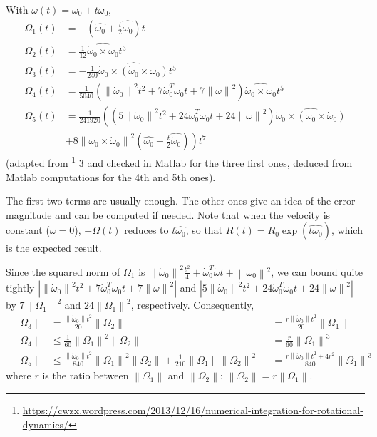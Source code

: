 \documentclass[]{article}
\newcommand{\norm}[1]{\left\| #1 \right\|}
\newcommand{\w}{\omega}
\newcommand{\dw}{\dot{\omega}}
\begin{document}
With $\w(t) = \w_0 + t \dot{\w}_0$,
\begin{align}
	\Omega_1(t) & = -(\widehat{\w_0} + \frac{t}{2}\widehat{\dw_0})t \\
	\Omega_2(t) & = \frac{1}{12} \widehat{\dw_0 \times \w_0} t^3 \\
	\Omega_3(t) & = -\frac{1}{240} \widehat{\dw_0 \times (\dw_0 \times \w_0)}t^5 \\
	\Omega_4(t) & = \frac{1}{5040} (\norm{\dw_0}^2 t^2 + 7 \dw_0^T\w_0 t + 7 \norm{\w}^2) \widehat{\dw_0 \times \w_0}t^5 \\
	\Omega_5(t) & = \frac{1}{241920} \left((5\norm{\dw_0}^2 t^2 + 24\dw_0^T\w_0 t + 24\norm{\w}^2) \widehat{\dw_0 \times (\w_0 \times \dw_0)}\right. \\
	& \left.+ 8\norm{\w_0 \times \dw_0}^2 (\widehat{\w_0} + \frac{t}{2}\widehat{\dw_0})\right) t^7
\end{align}
(adapted from \footnote{\scriptsize \url{https://cwzx.wordpress.com/2013/12/16/numerical-integration-for-rotational-dynamics/}} 3 and checked in Matlab for the three first ones, deduced from Matlab computations for the 4th and 5th ones).

The first two terms are usually enough. The other ones give an idea of the error magnitude and can be computed if needed. Note that when the velocity is constant ($\dw = 0$), $-\Omega(t)$ reduces to $t \widehat{\w_0}$, so that $R(t) = R_0 \exp(\widehat{t\w_0})$, which is the expected result.

Since the squared norm of $\Omega_1$ is $\norm{\dw_0}^2 \frac{t^2}{4} + \dw_0^T \dw t + \norm{\w_0}^2$, we can bound quite tightly $\left|\norm{\dw_0}^2 t^2 + 7 \dw_0^T\w_0 t + 7 \norm{\w}^2 \right|$ and $\left|5\norm{\dw_0}^2 t^2 + 24\dw_0^T\w_0 t + 24\norm{\w}^2\right|$ by $7\norm{\Omega_1}^2$ and $24\norm{\Omega_1}^2$, respectively. Consequently,
\begin{align}
	\norm{\Omega_3} &= \frac{\norm{\dw_0} t^2}{20} \norm{\Omega_2} &&= \frac{r \norm{\dw_0} t^2}{20} \norm{\Omega_1}\\
	\norm{\Omega_4} &\leq \frac{1}{60} \norm{\Omega_1}^2\norm{\Omega_2} &&= \frac{r}{60} \norm{\Omega_1}^3\\
	\norm{\Omega_5} &\leq \frac{\norm{\dw_0} t^2}{840} \norm{\Omega_1}^2 \norm{\Omega_2} + \frac{1}{210} \norm{\Omega_1} \norm{\Omega_2}^2 &&= \frac{r \norm{\dw_0} t^2 + 4r^2}{840} \norm{\Omega_1}^3
\end{align}
where $r$ is the ratio between $\norm{\Omega_1}$ and $\norm{\Omega_2}$: $\norm{\Omega_2} = r \norm{\Omega_1}$.
\end{document}
